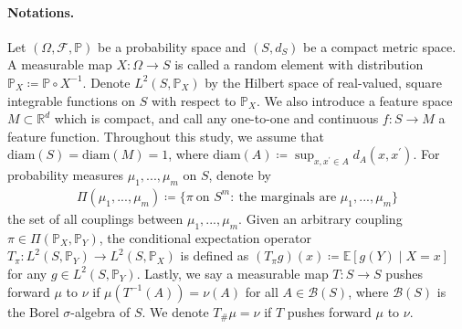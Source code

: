 \documentclass{article}
\begin{document}
\paragraph{Notations.}
Let $(\Omega,\mathcal{F},\mathbb{P})$ be a probability space and $(S,d_S)$ be a compact metric space. 
A measurable map $X:\Omega\to S$ is called a random element with distribution $\mathbb{P}_X\coloneqq\mathbb{P}\circ X^{-1}$. Denote $L^2(S,\mathbb{P}_X)$ by the Hilbert space of real-valued, square integrable functions on $S$ with respect to $\mathbb{P}_X$.
We also introduce a feature space $M\subset\mathbb{R}^d$ which is compact, and call any one-to-one and continuous $f:S\to M$ a feature function. Throughout this study, we assume that $\mathrm{diam}(S) = \mathrm{diam}(M) = 1$, where $\mathrm{diam}(A) \coloneqq \sup_{x,x^\prime \in A}d_A(x,x^\prime)$. For probability measures $\mu_1,...,\mu_m$ on $S$, denote by
\begin{align*}
	\Pi(\mu_1,...,\mu_m) \coloneqq \{\pi\ \text{on } S^m :\ \text{the marginals are $\mu_1,...,\mu_m$}\}
\end{align*}
the set of all couplings between $\mu_1,...,\mu_m$. Given an arbitrary coupling $\pi \in \Pi(\mathbb{P}_X,\mathbb{P}_Y)$, the conditional expectation operator $T_{\pi}: L^2(S,\mathbb{P}_Y) \to L^2(S,\mathbb{P}_X)$ is defined as $(T_{\pi}g)(x) \coloneqq \mathbb{E}[g(Y) \mid X = x]$ for any $g \in L^2(S,\mathbb{P}_Y)$. Lastly, we say a measurable map $T: S \to S$ pushes forward $\mu$ to $\nu$ if $\mu(T^{-1}(A)) = \nu(A)$ for all $A \in \mathcal{B}(S)$, where $\mathcal{B}(S)$ is the Borel $\sigma$-algebra of $S$. We denote $T_{\#}\mu = \nu$ if $T$ pushes forward $\mu$ to $\nu$.

\end{document}
